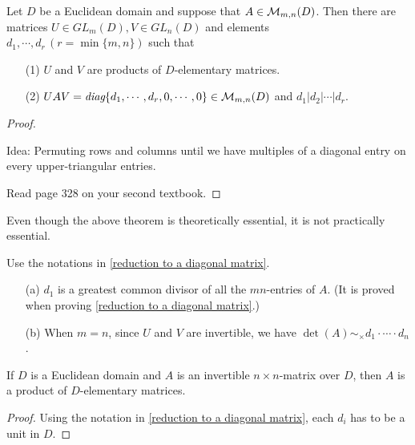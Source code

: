 \begin{thm}\label{reduction to a diagonal matrix}
    Let $D$ be a Euclidean domain and suppose that $A\in{\mathcal{M}}_{m, n}(D)$.
    Then there are matrices $U\in GL_m(D), V\in GL_n(D)$ and elements $d_1, \cdots, d_r\,(r=\min\{m, n\})$ such that
    \begin{enumerate}
        \item[(1)]
        {
            $U$ and $V$ are products of $D$-elementary matrices.
        }
        \item[(2)]
        {
            $UAV=\textit{diag}\{d_1, \cdots, d_r, 0, \cdots, 0\}\in{\mathcal{M}}_{m, n}(D)$ and $d_1|d_2|\cdots|d_r$.
        }
    \end{enumerate}
\end{thm}
\begin{proof}
    \begin{center}
        Idea: Permuting rows and columns until we have multiples of a diagonal entry on every upper-triangular entries.
    \end{center}
    \color{red}Read page 328 on your second textbook.\color{black}
\end{proof}
Even though the above theorem is theoretically essential, it is not practically essential.
\begin{prop}
    Use the notations in \cref{reduction to a diagonal matrix}.
    \begin{enumerate}
        \item[(a)]
        {
            $d_1$ is a greatest common divisor of all the $mn$-entries of $A$.
            (It is proved when proving \cref{reduction to a diagonal matrix}.)
        }
        \item[(b)]
        {
            When $m=n$, since $U$ and $V$ are invertible, we have $\det(A)\sim_\times d_1\cdot\cdots\cdot d_n$.
        }
    \end{enumerate}
\end{prop}
\begin{prop}
    If $D$ is a Euclidean domain and $A$ is an invertible $n\times n$-matrix over $D$, then $A$ is a product of $D$-elementary matrices.
\end{prop}
\begin{proof}
    Using the notation in \cref{reduction to a diagonal matrix}, each $d_i$ has to be a unit in $D$.
\end{proof}

